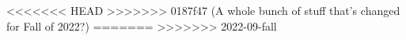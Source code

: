 \documentclass{../../oss-apphys-exam}
\begin{document}
\begin{multicols*}{2}
\begin{questions}
\begin{choices}
\begin{choices}
    \columnbreak
<<<<<<< HEAD
>>>>>>> 0187f47 (A whole bunch of stuff that's changed for Fall of 2022?)
=======
>>>>>>> 2022-09-fall
%    
%    
   

\end{choices}
\end{choices}
\end{questions}
\end{multicols*}
\end{document}
